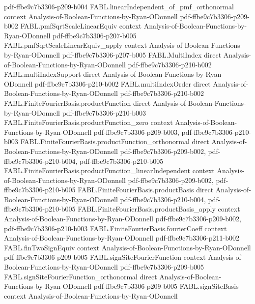 \begin{theorem}
  {pdf-ffbe9c7b3306-p209-b004}
\proofstep
  {FABL.linearIndependent_of_pmf_orthonormal}
  {context}
  {Analysis-of-Boolean-Functions-by-Ryan-ODonnell}
  {pdf-ffbe9c7b3306-p209-b002}
\proofstep
  {FABL.pmfSqrtScaleLinearEquiv}
  {context}
  {Analysis-of-Boolean-Functions-by-Ryan-ODonnell}
  {pdf-ffbe9c7b3306-p207-b005}
\proofstep
  {FABL.pmfSqrtScaleLinearEquiv_apply}
  {context}
  {Analysis-of-Boolean-Functions-by-Ryan-ODonnell}
  {pdf-ffbe9c7b3306-p207-b005}
\proofstep
  {FABL.MultiIndex}
  {direct}
  {Analysis-of-Boolean-Functions-by-Ryan-ODonnell}
  {pdf-ffbe9c7b3306-p210-b002}
\proofstep
  {FABL.multiIndexSupport}
  {direct}
  {Analysis-of-Boolean-Functions-by-Ryan-ODonnell}
  {pdf-ffbe9c7b3306-p210-b002}
\proofstep
  {FABL.multiIndexOrder}
  {direct}
  {Analysis-of-Boolean-Functions-by-Ryan-ODonnell}
  {pdf-ffbe9c7b3306-p210-b002}
\proofstep
  {FABL.FiniteFourierBasis.productFunction}
  {direct}
  {Analysis-of-Boolean-Functions-by-Ryan-ODonnell}
  {pdf-ffbe9c7b3306-p210-b003}
\proofstep
  {FABL.FiniteFourierBasis.productFunction_zero}
  {context}
  {Analysis-of-Boolean-Functions-by-Ryan-ODonnell}
  {pdf-ffbe9c7b3306-p209-b003,
    pdf-ffbe9c7b3306-p210-b003}
\proofstep
  {FABL.FiniteFourierBasis.productFunction_orthonormal}
  {direct}
  {Analysis-of-Boolean-Functions-by-Ryan-ODonnell}
  {pdf-ffbe9c7b3306-p209-b002,
    pdf-ffbe9c7b3306-p210-b004,
    pdf-ffbe9c7b3306-p210-b005}
\proofstep
  {FABL.FiniteFourierBasis.productFunction_linearIndependent}
  {context}
  {Analysis-of-Boolean-Functions-by-Ryan-ODonnell}
  {pdf-ffbe9c7b3306-p209-b002,
    pdf-ffbe9c7b3306-p210-b005}
\proofstep
  {FABL.FiniteFourierBasis.productBasis}
  {direct}
  {Analysis-of-Boolean-Functions-by-Ryan-ODonnell}
  {pdf-ffbe9c7b3306-p210-b004,
    pdf-ffbe9c7b3306-p210-b005}
\proofstep
  {FABL.FiniteFourierBasis.productBasis_apply}
  {context}
  {Analysis-of-Boolean-Functions-by-Ryan-ODonnell}
  {pdf-ffbe9c7b3306-p209-b002,
    pdf-ffbe9c7b3306-p210-b003}
\proofstep
  {FABL.FiniteFourierBasis.fourierCoeff}
  {context}
  {Analysis-of-Boolean-Functions-by-Ryan-ODonnell}
  {pdf-ffbe9c7b3306-p211-b002}
\proofstep
  {FABL.finTwoSignEquiv}
  {context}
  {Analysis-of-Boolean-Functions-by-Ryan-ODonnell}
  {pdf-ffbe9c7b3306-p209-b005}
\proofstep
  {FABL.signSiteFourierFunction}
  {context}
  {Analysis-of-Boolean-Functions-by-Ryan-ODonnell}
  {pdf-ffbe9c7b3306-p209-b005}
\proofstep
  {FABL.signSiteFourierFunction_orthonormal}
  {direct}
  {Analysis-of-Boolean-Functions-by-Ryan-ODonnell}
  {pdf-ffbe9c7b3306-p209-b005}
\proofstep
  {FABL.signSiteBasis}
  {context}
  {Analysis-of-Boolean-Functions-by-Ryan-ODonnell}

\end{theorem}
